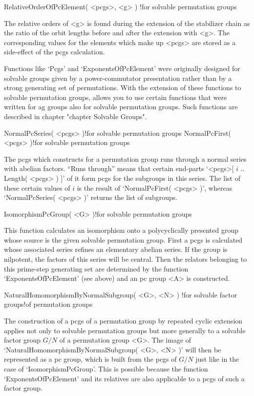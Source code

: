 \>RelativeOrderOfPcElement( <pcgs>, <g> )%
  !{for solvable permutation groups}

The  relative  orders  of  <g>  is  found during   the   extension of the
stabilizer chain as the ratio  of the orbit  lengths before and after the
extension with <g>. The corresponding values  for the elements which make
up <pcgs> are stored as a side-effect of the pcgs calculation.

Functions like `Pcgs' and `ExponentsOfPcElement' were originally designed
for solvable groups given by  a power-commutator presentation rather than
by a strong  generating set of  permutations. With the extension of these
functions to solvable  permutation   groups,  {\GAP} allows you    to use
certain functions  that   were written  for ag  groups  also for solvable
permutation   groups.     Such  functions   are   described    in chapter
"chapter Solvable Groups".

\>NormalPcSeries( <pcgs> )!{for solvable permutation groups}
\>NormalPcFirst( <pcgs> )!{for solvable permutation groups}

The pcgs  which {\GAP} constructs for  a permutation group runs through a
normal  series with abelian  factors. ``Runs through'' means that certain
end-parts  `<pcgs>[ $i$ ..  Length( <pcgs> ) ]'  of it form  pcgs for the
subgroups in this series. The list of these certain values  of $i$ is the
result of `NormalPcFirst( <pcgs>  )', whereas `NormalPcSeries( <pcgs>  )'
returns the list of subgroups.

\>IsomorphismPcGroup( <G> )!{for solvable permutation groups}

This function calculates an  isomorphism onto a  polycyclically presented
group whose source is the given solvable permutation  group. First a pcgs
is  calculated whose  associated  series  refines an  elementary  abelian
series. If the  group is  nilpotent, the  factors of this  series will be
central. Then  the relators belonging  to this  prime-step generating set
are determined by the function  `ExponentsOfPcElement' (see above) and an
pc group <A> is constructed.

\>NaturalHomomorphismByNormalSubgroup( <G>, <N> )%
  !{for solvable factor groups!of permutation groups}

The construction  of a  pcgs of a  permutation  group by  repeated cyclic
extension   applies  not only to   solvable permutation   groups but more
generally to a solvable factor  group $G/N$ of  a permutation group  <G>.
The image of `NaturalHomomorphismByNormalSubgroup( <G>,  <N> )' will then
be represented as a pc group, which is built  from the pcgs of $G/N$ just
like in the  case of `IsomorphismPcGroup'. This  is  possible because the
function `ExponentsOfPcElement' and  its relatives are also applicable to
a pcgs of such a factor group.

